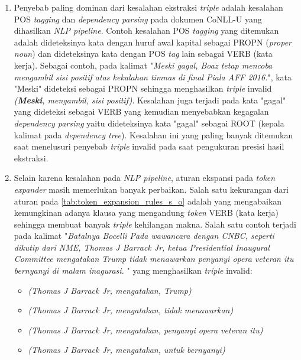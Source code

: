 \begin{enumerate}
	
	\item Penyebab paling dominan dari kesalahan ekstraksi \textit{triple} adalah kesalahan POS \textit{tagging} dan \textit{dependency parsing} pada dokumen CoNLL-U yang dihasilkan \textit{NLP pipeline}. Contoh kesalahan POS \textit{tagging} yang ditemukan adalah dideteksinya kata dengan huruf awal kapital sebagai PROPN (\textit{proper noun}) dan dideteksinya kata dengan POS \textit{tag} lain sebagai VERB (kata kerja). Sebagai contoh, pada kalimat "\textit{Meski gagal, Boaz tetap mencoba mengambil sisi positif atas kekalahan timnas di final Piala AFF 2016.}", kata "Meski" dideteksi sebagai PROPN sehingga menghasilkan \textit{triple} invalid \textit{(\textbf{Meski}, mengambil, sisi positif)}. Kesalahan juga terjadi pada kata "gagal" yang dideteksi sebagai VERB yang kemudian menyebabkan kegagalan \textit{dependency parsing} yaitu dideteksinya kata "gagal" sebagai ROOT (kepala kalimat pada \textit{dependency tree}). Kesalahan ini yang paling banyak ditemukan saat menelusuri penyebab \textit{triple} invalid pada saat pengukuran presisi hasil ekstraksi. 
	
	\item Selain karena kesalahan pada \textit{NLP pipeline}, aturan ekspansi pada \textit{token expander} masih memerlukan banyak perbaikan. Salah satu kekurangan dari aturan pada \ref{tab:token_expansion_rules_s_o} adalah yang mengabaikan kemungkinan adanya klausa yang mengandung \textit{token} VERB (kata kerja) sehingga membuat banyak \textit{triple} kehilangan makna. Salah satu contoh terjadi pada kalimat "\textit{Batalnya Bocelli Pada wawancara dengan CNBC, seperti dikutip dari NME, Thomas J Barrack Jr, ketua Presidential Inaugural Committee mengatakan Trump tidak menawarkan penyanyi opera veteran itu bernyanyi di malam inagurasi.
	}" yang menghasilkan \textit{triple} invalid:

	\begin{itemize}
		\item \textit{(Thomas J Barrack Jr, mengatakan, Trump)}
		\item \textit{(Thomas J Barrack Jr,	mengatakan, tidak menawarkan)}
		\item \textit{(Thomas J Barrack Jr, mengatakan,	penyanyi opera veteran itu)}
		\item \textit{(Thomas J Barrack Jr, mengatakan,	untuk bernyanyi)}
	\end{itemize}
	

\end{enumerate}
